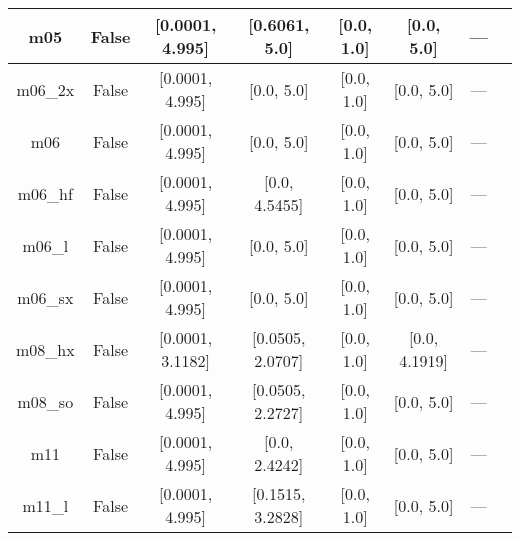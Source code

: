 \begin{tabular}{|c|c|c|c|c|c|c|l|}
          m05 &                 False &  [0.0001, 4.995] &    [0.6061, 5.0] &       [0.0, 1.0] &     [0.0, 5.0] &        --- &                                                             \cite{Zhao2005_161103} \\ \hline
      m06\_2x &                 False &  [0.0001, 4.995] &       [0.0, 5.0] &       [0.0, 1.0] &     [0.0, 5.0] &        --- &                                                                \cite{Zhao2008_215} \\ \hline
          m06 &                 False &  [0.0001, 4.995] &       [0.0, 5.0] &       [0.0, 1.0] &     [0.0, 5.0] &        --- &                                                                \cite{Zhao2008_215} \\ \hline
      m06\_hf &                 False &  [0.0001, 4.995] &    [0.0, 4.5455] &       [0.0, 1.0] &     [0.0, 5.0] &        --- &                                                              \cite{Zhao2006_13126} \\ \hline
       m06\_l &                 False &  [0.0001, 4.995] &       [0.0, 5.0] &       [0.0, 1.0] &     [0.0, 5.0] &        --- &                                                \cite{Zhao2006_194101,Zhao2008_215} \\ \hline
      m06\_sx &                 False &  [0.0001, 4.995] &       [0.0, 5.0] &       [0.0, 1.0] &     [0.0, 5.0] &        --- &                                                               \cite{Wang2020_2294} \\ \hline
      m08\_hx &                 False & [0.0001, 3.1182] & [0.0505, 2.0707] &       [0.0, 1.0] &  [0.0, 4.1919] &        --- &                                                               \cite{Zhao2008_1849} \\ \hline
      m08\_so &                 False &  [0.0001, 4.995] & [0.0505, 2.2727] &       [0.0, 1.0] &     [0.0, 5.0] &        --- &                                                               \cite{Zhao2008_1849} \\ \hline
          m11 &                 False &  [0.0001, 4.995] &    [0.0, 2.4242] &       [0.0, 1.0] &     [0.0, 5.0] &        --- &                                                           \cite{Peverati2011_2810} \\ \hline
       m11\_l &                 False &  [0.0001, 4.995] & [0.1515, 3.2828] &       [0.0, 1.0] &     [0.0, 5.0] &        --- &                                                            \cite{Peverati2012_117} \\ \hline

\end{tabular}
